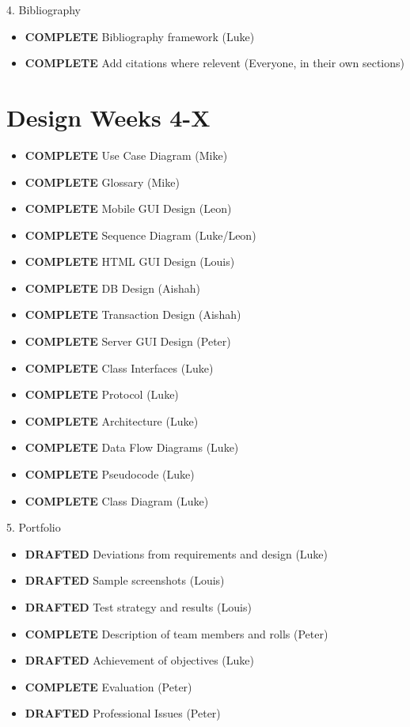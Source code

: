 4. Bibliography
\begin{itemize}
\item \textbf{COMPLETE} Bibliography framework (Luke)
\item \textbf{COMPLETE} Add citations where relevent (Everyone, in their own sections)
\end{itemize}

\section{Design \textbf{Weeks 4-X}}
\begin{itemize}
\item \textbf{COMPLETE}   Use Case Diagram (Mike)
\item \textbf{COMPLETE}   Glossary (Mike)
\item \textbf{COMPLETE}   Mobile GUI Design (Leon)
\item \textbf{COMPLETE}   Sequence Diagram (Luke/Leon)
\item \textbf{COMPLETE}   HTML GUI Design (Louis)
\item \textbf{COMPLETE}   DB Design (Aishah)
\item \textbf{COMPLETE}   Transaction Design (Aishah)
\item \textbf{COMPLETE}   Server GUI Design (Peter)
\item \textbf{COMPLETE}   Class Interfaces (Luke)
\item \textbf{COMPLETE}   Protocol (Luke)
\item \textbf{COMPLETE}   Architecture (Luke)
\item \textbf{COMPLETE}   Data Flow Diagrams (Luke)
\item \textbf{COMPLETE}   Pseudocode (Luke)
\item \textbf{COMPLETE}   Class Diagram (Luke)
\end{itemize}

5. Portfolio
\begin{itemize}
\item \textbf{DRAFTED}    Deviations from requirements and design (Luke)
\item \textbf{DRAFTED}    Sample screenshots (Louis)
\item \textbf{DRAFTED}    Test strategy and results (Louis)
\item \textbf{COMPLETE}   Description of team members and rolls (Peter)
\item \textbf{DRAFTED}    Achievement of objectives (Luke)
\item \textbf{COMPLETE}   Evaluation (Peter)
\item \textbf{DRAFTED}    Professional Issues (Peter)
\end{itemize}

